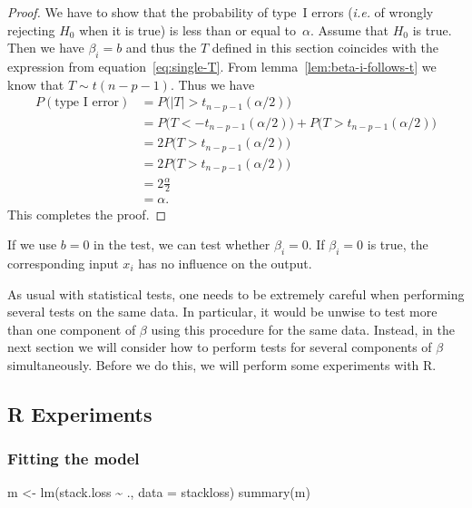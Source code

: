\documentclass[
  a4paper,
]{article}
\newenvironment{Shaded}{\begin{snugshade}}{\end{snugshade}}
\newcommand{\AttributeTok}[1]{\textcolor[rgb]{0.77,0.63,0.00}{#1}}
\newcommand{\FunctionTok}[1]{\textcolor[rgb]{0.00,0.00,0.00}{#1}}
\newcommand{\NormalTok}[1]{#1}
\newcommand{\OtherTok}[1]{\textcolor[rgb]{0.56,0.35,0.01}{#1}}
\newcommand{\SpecialCharTok}[1]{\textcolor[rgb]{0.00,0.00,0.00}{#1}}
\theoremstyle{definition}
\theoremstyle{definition}
\theoremstyle{definition}
\theoremstyle{definition}
\theoremstyle{remark}
\begin{document}
\begin{proof}
We have to show that the probability of type~I errors (\emph{i.e.} of wrongly
rejecting \(H_0\) when it is true) is less than or equal to~\(\alpha\).
Assume that \(H_0\) is true. Then we have \(\beta_i = b\) and thus
the \(T\) defined in this section coincides with the expression from
equation~\eqref{eq:single-T}. From lemma~\ref{lem:beta-i-follows-t}
we know that \(T \sim t(n-p-1)\). Thus we have
\begin{align*}
  P( \mbox{type I error} )
  &= P\bigl( |T| > t_{n-p-1}(\alpha/2) \bigr) \\
  &= P\bigl(T < -t_{n-p-1}(\alpha/2) \bigr) + P\bigl(T > t_{n-p-1}(\alpha/2) \bigr) \\
  &= 2 P\bigl(T > t_{n-p-1}(\alpha/2) \bigr) \\
  &= 2 P\bigl(T > t_{n-p-1}(\alpha/2) \bigr) \\
  &= 2 \frac{\alpha}{2} \\
  &= \alpha.
\end{align*}
This completes the proof.
\end{proof}

If we use \(b = 0\) in the test, we can test whether \(\beta_i = 0\).
If \(\beta_i = 0\) is true, the corresponding input \(x_i\) has no influence
on the output.

As usual with statistical tests, one needs to be extremely careful when
performing several tests on the same data. In particular, it would be
unwise to test more than one component of \(\beta\) using this procedure
for the same data. Instead, in the next section we will consider how
to perform tests for several components of \(\beta\) simultaneously.
Before we do this, we will perform some experiments with R.

\hypertarget{r-experiments}{%
\subsection{R Experiments}\label{r-experiments}}

\hypertarget{fitting-the-model}{%
\subsubsection{Fitting the model}\label{fitting-the-model}}

\begin{Shaded}
\begin{Highlighting}[]
\NormalTok{m }\OtherTok{\textless{}{-}} \FunctionTok{lm}\NormalTok{(stack.loss }\SpecialCharTok{\textasciitilde{}}\NormalTok{ ., }\AttributeTok{data =}\NormalTok{ stackloss)}
\FunctionTok{summary}\NormalTok{(m)}
\end{Highlighting}
\end{Shaded}
\end{document}
